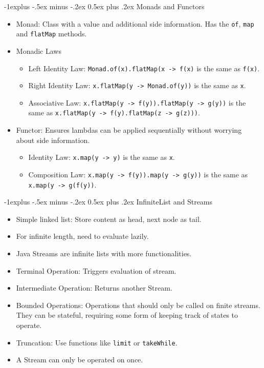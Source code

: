 \documentclass[10pt, landscape]{article}
\makeatletter
\renewcommand{\section}{\@startsection{section}{1}{0mm}%
                                {-1ex plus -.5ex minus -.2ex}%
                                {0.5ex plus .2ex}%
                                {\normalfont\large\bfseries}}
\renewcommand{\section}{\@startsection{section}{2}{0mm}%
                                {-1explus -.5ex minus -.2ex}%
                                {0.5ex plus .2ex}%
                                {\normalfont\normalsize\bfseries}}
\makeatother
\begin{document}
\begin{multicols*}{4}
\section{Monads and Functors}
\begin{itemize}
    \item Monad: Class with a value and additional side information. Has the \verb|of|, \verb|map| and \verb|flatMap| methods.
    \item Monadic Laws
    \begin{itemize}
        \item Left Identity Law: \verb|Monad.of(x).flatMap(x -> f(x)| is the same as \verb|f(x)|.
        \item Right Identity Law: \verb|x.flatMap(y -> Monad.of(y))| is the same as \verb|x|.
        \item Associative Law: \verb|x.flatMap(y -> f(y)).flatMap(y -> g(y))| is the same as \verb|x.flatMap(y -> f(y).flatMap(z -> g(z)))|.
    \end{itemize}
    \item Functor: Ensures lambdas can be applied sequentially without worrying about side information.
    \begin{itemize}
        \item Identity Law: \verb|x.map(y -> y)| is the same as \verb|x|.
        \item Composition Law: \verb|x.map(y -> f(y)).map(y -> g(y))| is the same as \verb|x.map(y -> g(f(y))|.
    \end{itemize}
\end{itemize}

\section{InfiniteList and Streams}
\begin{itemize}
    \item Simple linked list: Store content as head, next node as tail.
    \item For infinite length, need to evaluate lazily.
    \item Java Streams are infinite lists with more functionalities.
    \item Terminal Operation: Triggers evaluation of stream.
    \item Intermediate Operation: Returns another Stream.
    \item Bounded Operations: Operations that should only be called on finite streams. They can be stateful, requiring some form of keeping track of states to operate.
    \item Truncation: Use functions like \verb|limit| or \verb|takeWhile|.
    \item A Stream can only be operated on once.
\end{itemize}


\end{multicols*}
\end{document}
